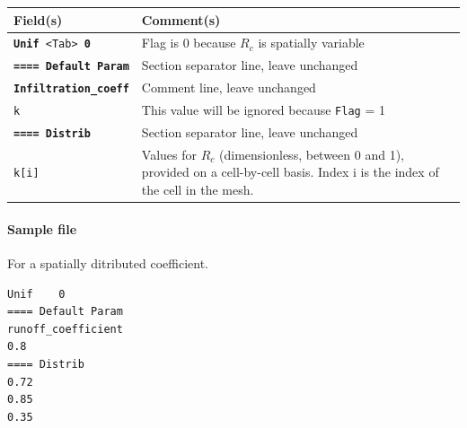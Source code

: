     \begin{tabular}{p{6cm} | p{9cm}}
    \hline
    Field(s) & Comment(s) \\
    \hline  \hline
    \texttt{\textbf{Unif} <Tab> \textbf{0}} & Flag is 0 because $R_c$ is spatially variable \\ 
    \hline
    \texttt{\textbf{==== Default Param}} & Section separator line, leave unchanged \\ 
    \hline
    \texttt{\textbf{Infiltration\_coeff}} & Comment line, leave unchanged \\ 
    \hline
    \texttt{k}     & This value will be ignored because \texttt{Flag} = 1 \\ 
    \hline
    \texttt{\textbf{==== Distrib}} & Section separator line, leave unchanged \\  
    \hline
    \texttt{k[i]}      & Values for $R_c$ (dimensionless, between 0 and 1), provided on a cell-by-cell basis. Index i is the index of the cell in the mesh.  \\ 
    \hline
    \end{tabular}

\paragraph*{Sample file}
For a spatially ditributed coefficient.

\begin{verbatim}
Unif	0
==== Default Param
runoff_coefficient
0.8
==== Distrib
0.72
0.85
0.35
\end{verbatim}